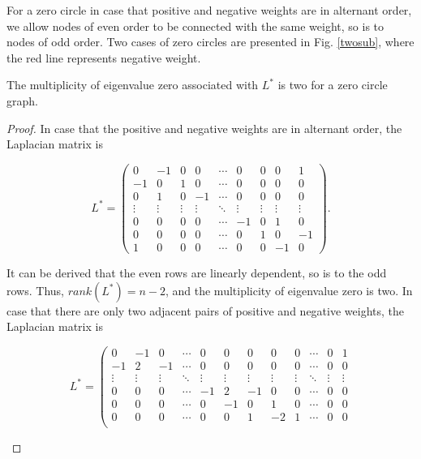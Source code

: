 \documentclass[a4paper,11pt]{article}
\begin{document}
For a zero circle in case that positive and negative weights are in alternant order, we allow nodes of even order to be connected with the same weight, so is to nodes of odd order. Two cases of zero circles are presented in Fig. \ref{twosub}, where the red line represents negative weight.

\begin{lemma}\label{zero}
The multiplicity of eigenvalue zero associated with $L^*$ is two for a zero circle graph.
\end{lemma}

\begin{proof}
In case that the positive and negative weights are in alternant order, the Laplacian matrix is
{\begin{footnotesize}\begin{equation*}
L^*=\left( {\begin{array}{*{20}{r}}
0&{ - 1}&0&0& \cdots &0&0&0&1\\
{ - 1}&0&1&0& \cdots &0&0&0&0\\
0&1&0&{ - 1}& \cdots &0&0&0&0\\
 \vdots & \vdots & \vdots & \vdots & \ddots & \vdots & \vdots & \vdots & \vdots \\
0&0&0&0& \cdots &{ - 1}&0&1&0\\
0&0&0&0& \cdots &0&1&0&{ - 1}\\
1&0&0&0& \cdots &0&0&{ - 1}&0
\end{array}} \right).
\end{equation*}\end{footnotesize}}
It can be derived that the even rows are linearly dependent, so is to the odd rows. Thus, $rank(L^*)=n-2$, and the multiplicity of eigenvalue zero is two. In case that there are only two adjacent pairs of positive and negative weights, the Laplacian matrix is
{\begin{scriptsize}\begin{equation*}
L^*\!=\!\left(\!\!\! {\begin{array}{*{20}{r}}
0&{ - 1}&0& \cdots &0&0&0&0&0& \cdots &0&1\\
{ - 1}&2&{ - 1}& \cdots &0&0&0&0&0& \cdots &0&0\\
 \vdots & \vdots & \vdots & \ddots & \vdots & \vdots & \vdots & \vdots & \vdots & \ddots & \vdots & \vdots \\
0&0&0& \cdots &{ - 1}&2&{ - 1}&0&0& \cdots &0&0\\
0&0&0& \cdots &0&{ - 1}&0&1&0& \cdots &0&0\\
0&0&0& \cdots &0&0&1&{ - 2}&1& \cdots &0&0\\

\end{array}}
\end{equation*}
\end{scriptsize}}
\end{proof}
\end{document}
